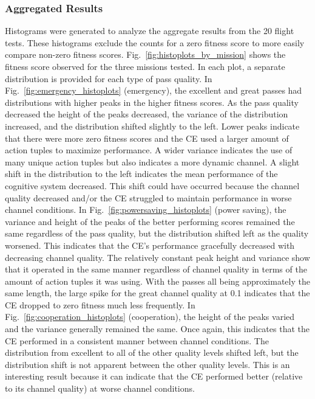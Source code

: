 \documentclass[journal]{IEEEtran}
\begin{document}
\subsubsection{Aggregated Results}
Histograms were generated to analyze the aggregate results from the 20 flight tests.  These histograms exclude the counts for a zero fitness score to more easily compare non-zero fitness scores.  Fig.~\ref{fig:histoplots_by_mission} shows the fitness score observed for the three missions tested.  In each plot, a separate distribution is provided for each type of pass quality.  In Fig.~\ref{fig:emergency_histoplots} (emergency), the excellent and great passes had distributions with higher peaks in the higher fitness scores.  As the pass quality decreased the height of the peaks decreased, the variance of the distribution increased, and the distribution shifted slightly to the left.  Lower peaks indicate that there were more zero fitness scores and the CE used a larger amount of action tuples to maximize performance.  A wider variance indicates the use of many unique action tuples but also indicates a more dynamic channel.  A slight shift in the distribution to the left indicates the mean performance of the cognitive system decreased.  This shift could have occurred because the channel quality decreased and/or the CE struggled to maintain performance in worse channel conditions.  In Fig.~\ref{fig:powersaving_histoplots} (power saving), the variance and height of the peaks of the better performing scores remained the same regardless of the pass quality, but the distribution shifted left as the quality worsened.  This indicates that the CE's performance gracefully decreased with decreasing channel quality.  The relatively constant peak height and variance show that it operated in the same manner regardless of channel quality in terms of the amount of action tuples it was using.  With the passes all being approximately the same length, the large spike for the great channel quality at 0.1 indicates that the CE dropped to zero fitness much less frequently.  In Fig.~\ref{fig:cooperation_histoplots} (cooperation), the height of the peaks varied and the variance generally remained the same.  Once again, this indicates that the CE performed in a consistent manner between channel conditions.  The distribution from excellent to all of the other quality levels shifted left, but the distribution shift is not apparent between the other quality levels.  This is an interesting result because it can indicate that the CE performed better (relative to its channel quality) at worse channel conditions.
\end{document}
